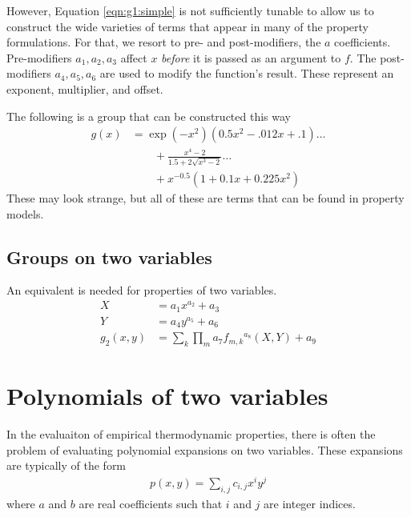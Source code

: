 \documentclass[twocolumn,letterpaper,11pt]{article}
\begin{document}
However, Equation \ref{eqn:g1:simple} is not sufficiently tunable to allow us to construct the wide varieties of terms that appear in many of the property formulations.  For that, we resort to pre- and post-modifiers, the $a$ coefficients.  Pre-modifiers $a_1, a_2, a_3$ affect $x$ \emph{before} it is passed as an argument to $f$.  The post-modifiers $a_4,a_5,a_6$ are used to modify the function's result.  These represent an exponent, multiplier, and offset.

The following is a group that can be constructed this way
\begin{align}
g(x) &= \exp\left(-x^2\right) (0.5 x^2 - .012 x + .1)\ldots\nonumber\\
    & \hspace{2em} + \frac{x^4 - 2}{1.5 + 2\sqrt{x^3 - 2}}\ldots\nonumber\\
    & \hspace{2em} + x^{-0.5} (1 + 0.1x + 0.225x^2)
\end{align}
These may look strange, but all of these are terms that can be found in property models.

\subsection{Groups on two variables}
An equivalent is needed for properties of two variables.
\begin{subequations}
\begin{align}
X &= a_1 x^{a_2} + a_3\\
Y &= a_4 y^{a_5} + a_6\\
g_2(x,y) &= \sum_k \prod_m a_7 f_{m,k}{^{a_8}} (X,Y) + a_9
\end{align}
\end{subequations}


\section{Polynomials of two variables}
In the evaluaiton of empirical thermodynamic properties, there is often the problem of evaluating polynomial expansions on two variables.  These expansions are typically of the form
\begin{align}
p(x,y) = \sum_{i,j} c_{i,j} x^i y^j\label{eqn:general}
\end{align}
where $a$ and $b$ are real coefficients such that $i$ and $j$ are integer indices.
\end{document}
